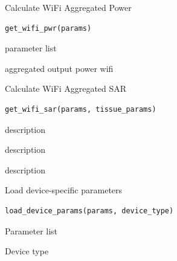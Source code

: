 \documentclass[a4paper]{book}
\begin{document}
%
\begin{Description}
Calculate WiFi Aggregated Power
\end{Description}
%
\begin{Usage}
\begin{verbatim}
get_wifi_pwr(params)
\end{verbatim}
\end{Usage}
%
\begin{Arguments}
\begin{ldescription}
\item[\code{params}] parameter list
\end{ldescription}
\end{Arguments}
%
\begin{Value}
aggregated output power wifi
\end{Value}
%
\begin{Description}
Calculate WiFi Aggregated SAR
\end{Description}
%
\begin{Usage}
\begin{verbatim}
get_wifi_sar(params, tissue_params)
\end{verbatim}
\end{Usage}
%
\begin{Arguments}
\begin{ldescription}
\item[\code{params}] description

\item[\code{tissue\_params}] description
\end{ldescription}
\end{Arguments}
%
\begin{Value}
description
\end{Value}
%
\begin{Description}
Load device-specific parameters
\end{Description}
%
\begin{Usage}
\begin{verbatim}
load_device_params(params, device_type)
\end{verbatim}
\end{Usage}
%
\begin{Arguments}
\begin{ldescription}
\item[\code{params}] Parameter list

\item[\code{device\_type}] Device type
\end{ldescription}
\end{Arguments}
\end{document}
